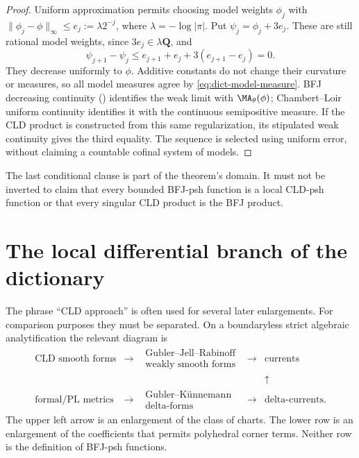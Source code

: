 \begin{proof}
Uniform approximation permits choosing model weights $\phi_j$ with
$\|\phi_j-\phi\|_\infty\leq e_j:=\lambda2^{-j}$, where
$\lambda=-\log|\pi|$. Put $\psi_j=\phi_j+3e_j$.
These are still rational model weights, since $3e_j\in\lambda\mathbf Q$,
and
\[
 \psi_{j+1}-\psi_j
 \leq e_{j+1}+e_j+3(e_{j+1}-e_j)=0.
\]
They decrease uniformly to $\phi$. Additive constants do not change
their curvature or measures, so all model measures agree by
\eqref{eq:dict-model-measure}. BFJ decreasing continuity
() identifies the weak limit with
$\MA_\theta(\phi)$; Chambert--Loir uniform continuity identifies it with
the continuous semipositive measure. If the CLD product is constructed
from this same regularization, its stipulated weak continuity gives the
third equality. The sequence is selected using uniform error, without
claiming a countable cofinal system of models.
\end{proof}

The last conditional clause is part of the theorem's domain.
It must not be inverted to claim that every bounded BFJ-psh function is a
local CLD-psh function or that every singular CLD product is the BFJ product.

\section{The local differential branch of the dictionary}
\label{sec:dict-local-differential-branch}

The phrase ``CLD approach'' is often used for several later enlargements.
For comparison purposes they must be separated.  On a boundaryless strict
algebraic analytification the relevant diagram is
\[
\begin{array}{ccccc}
\text{CLD smooth forms}
 &\longrightarrow&
\begin{array}{c}
\text{Gubler--Jell--Rabinoff}\\[-1mm]
\text{weakly smooth forms}
\end{array}
 &\longrightarrow&
\text{currents}
\\[2mm]
&&&&\uparrow
\\[-1mm]
\text{formal/PL metrics}
 &\longrightarrow&
\begin{array}{c}
\text{Gubler--K\"unnemann}\\[-1mm]
\text{delta-forms}
\end{array}
 &\longrightarrow&
\text{delta-currents}.
\end{array}
\tag{63.8}\label{eq:dict-local-differential-ladder}
\]
The upper left arrow is an enlargement of the class of charts.  The lower
row is an enlargement of the coefficients that permits polyhedral corner
terms.  Neither row is the definition of BFJ-psh functions.

